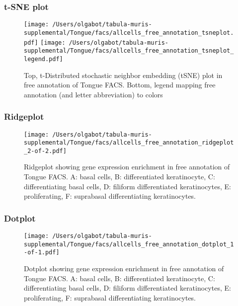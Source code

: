 \newpage
\subsubsection{t-SNE plot}
\begin{figure}[h]
\centering
\texttt{[image: /Users/olgabot/tabula-muris-supplemental/Tongue/facs/allcells\_free\_annotation\_tsneplot.pdf]}
\texttt{[image: /Users/olgabot/tabula-muris-supplemental/Tongue/facs/allcells\_free\_annotation\_tsneplot\_legend.pdf]}
\caption{Top, t-Distributed stochastic neighbor embedding (tSNE) plot  in free annotation of Tongue FACS. Bottom, legend mapping free annotation (and letter abbreviation) to colors}
\end{figure}


\newpage
\newpage
\subsubsection{Ridgeplot}
\begin{figure}[h]
\centering
\texttt{[image: /Users/olgabot/tabula-muris-supplemental/Tongue/facs/allcells\_free\_annotation\_ridgeplot\_2-of-2.pdf]}

\caption{ Ridgeplot  showing gene expression enrichment in free annotation of Tongue FACS. A: basal cells, B: differentiated keratinocyte, C: differentiating basal cells, D: filiform differentiated keratinocytes, E: proliferating, F: suprabasal differentiating keratinocytes.}
\end{figure}


\newpage
\newpage
\subsubsection{Dotplot}
\begin{figure}[h]
\centering
\texttt{[image: /Users/olgabot/tabula-muris-supplemental/Tongue/facs/allcells\_free\_annotation\_dotplot\_1-of-1.pdf]}

\caption{ Dotplot  showing gene expression enrichment in free annotation of Tongue FACS. A: basal cells, B: differentiated keratinocyte, C: differentiating basal cells, D: filiform differentiated keratinocytes, E: proliferating, F: suprabasal differentiating keratinocytes.}
\end{figure}

